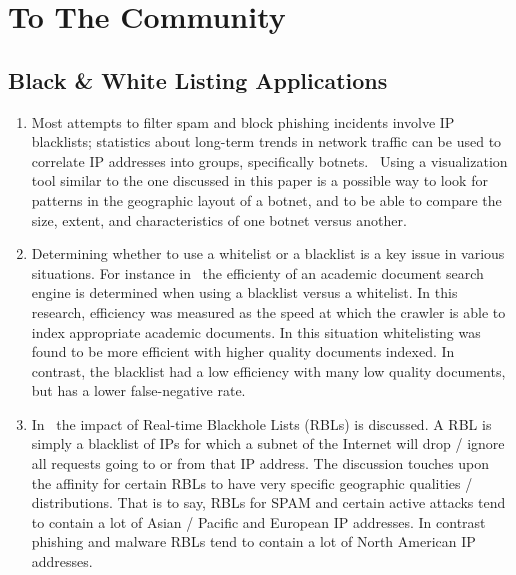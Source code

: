 \documentclass[aps,preprint,amsmath,amssymb]{revtex4}
\begin{document}
\section{To The Community}


\subsection{Black \& White Listing Applications}

\begin{enumerate}
\item Most attempts to filter spam and block phishing incidents involve IP blacklists;
statistics about long-term trends in network traffic can be used to correlate IP addresses
into groups, specifically botnets.~\cite{West:2011} Using a visualization tool similar to
the one discussed in this paper is a possible way to look for patterns in the geographic
layout of a botnet, and to be able to compare the size, extent, and characteristics of
one botnet versus another.
\item Determining whether to use a whitelist or a blacklist is a key issue in various
situations. For instance in~\cite{Wu:2012} the efficienty of an academic document search engine
is determined when using a blacklist versus a whitelist. In this research, efficiency was
measured as the speed at which the crawler is able to index appropriate academic documents.
In this situation whitelisting was found to be more efficient with higher quality documents
indexed. In contrast, the blacklist had a low efficiency with many low quality documents, but
has a lower false-negative rate.
\item In~\cite{Zhang:2013} the impact of Real-time Blackhole Lists (RBLs) is discussed.
A RBL is simply a blacklist of IPs for which a subnet of the Internet will drop / ignore
all requests going to or from that IP address.
The discussion touches upon the affinity for certain RBLs to have very specific geographic
qualities / distributions. That is to say, RBLs for SPAM and certain active attacks tend
to contain a lot of Asian / Pacific and European IP addresses. In contrast phishing and
malware RBLs tend to contain a lot of North American IP addresses.~\cite{Zhang:2013}
\end{enumerate}
\end{document}
